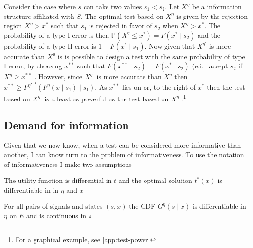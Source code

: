 \begin{example}\label{ex:t-transformation-2}
Consider the case where $s$ can take two values $s_{1}<s_{2}$. Let $X^{\eta}$ be a information structure affiliated with $S$. The optimal test based on $X^{\eta}$ is given by the rejection region $X^{\eta}>x^{*}$  such that $s_{1}$ is rejected in favor of $s_{2}$ when $X^{\eta}>x^{*}$. The probability of a type I error is then $\mathbb{P}(X^{\eta}\le x^{*})=F(x^{*}\mid s_{2})$ and the probability of a type II error is $1-F(x^{*}\mid s_{1})$. Now given that $X^{\eta'}$ is more accurate than $X^{\eta}$ is is possible to design a test with the same probability of type I error, by choosing $x^{**}$ such that $F(x^{**}\mid s_{2})=F(x^{*}\mid s_{2})$ (e.i. \ accept $s_{2}$ if $X^{\eta}\ge x^{**}$ . However, since $X^{\eta'}$ is more accurate than $X^{\eta}$  then $x^{**}\ge F^{\eta'^{-1}}(F^{\eta}(x\mid s_{1})\mid s_{1})$. As $x^{**}$ lies on or, to the right of $x^{*}$ then the test based on $X^{\eta'}$ is a least as powerful as the test based on $X^{\eta}$ \citep{Lehmann1988Comparing,Persico2000Information}.\footnote{For a graphical example, see \cref{app:test-power}}
\end{example}


\subsection{Demand for information}

Given that we now know, when a test can be considered more informative than another, I can know turn to the problem of informativeness. To use the notation of informativeness I make two assumptions

\begin{assumption}
	The utility function is differential in $t$ and the optimal solution $t^*(x)$ is differentiable in in $\eta$ and $x$
\end{assumption}
\begin{assumption}
	For all pairs of signals and states $(s,x)$ the CDF $G^\eta(s\mid x)$ is differentiable in $\eta$ on $E$ and is continuous in $s$
\end{assumption}

